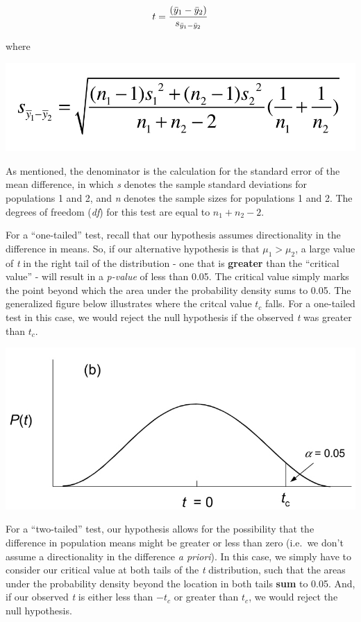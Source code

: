 \documentclass[]{book}
\begin{document}
\[\large t = \frac{(\bar{y}_1-\bar{y}_2)}{s_{\bar{y}_1-\bar{y}_2}} \]

where

\begin{center}\includegraphics[width=0.6\linewidth]{images/week_3.016} \end{center}

As mentioned, the denominator is the calculation for the standard error of the mean difference, in which \emph{s} denotes the sample standard deviations for populations 1 and 2, and \emph{n} denotes the sample sizes for populations 1 and 2. The degrees of freedom (\emph{df}) for this test are equal to \(n_1+n_2-2\).

For a ``one-tailed'' test, recall that our hypothesis assumes directionality in the difference in means. So, if our alternative hypothesis is that \(\mu_1>\mu_2\), a large value of \emph{t} in the right tail of the distribution - one that is \textbf{greater} than the ``critical value'' - will result in a \emph{p-value} of less than 0.05. The critical value simply marks the point beyond which the area under the probability density sums to 0.05. The generalized figure below illustrates where the critcal value \(t_c\) falls. For a one-tailed test in this case, we would reject the null hypothesis if the observed \emph{t} was greater than \(t_c\).

\begin{center}\includegraphics[width=0.9\linewidth]{images/week_3.005_1_tailed} \end{center}

For a ``two-tailed'' test, our hypothesis allows for the possibility that the difference in population means might be greater or less than zero (i.e.~we don't assume a directionality in the difference \emph{a priori}). In this case, we simply have to consider our critical value at both tails of the \emph{t} distribution, such that the areas under the probability density beyond the location in both tails \textbf{sum} to 0.05. And, if our observed \emph{t} is either less than \(-t_c\) or greater than \(t_c\), we would reject the null hypothesis.
\end{document}

